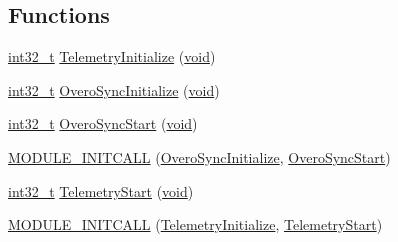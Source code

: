 \subsection*{Functions}
\begin{DoxyCompactItemize}
\item 
\hyperlink{group___n_a_m_e_gafd12020da5a235dfcf0c3c748fb5baed}{int32\-\_\-t} \hyperlink{group___telemetry_module_ga058925ecc8ea2cd938fb3e9d21edb2ac}{Telemetry\-Initialize} (\hyperlink{group___n_a_m_e_ga18028b8badbf1ea7e704ccac3c488e82}{void})
\item 
\hyperlink{group___n_a_m_e_gafd12020da5a235dfcf0c3c748fb5baed}{int32\-\_\-t} \hyperlink{group___telemetry_module_gae0e77f24c85219aa88e348edb409cf6c}{Overo\-Sync\-Initialize} (\hyperlink{group___n_a_m_e_ga18028b8badbf1ea7e704ccac3c488e82}{void})
\item 
\hyperlink{group___n_a_m_e_gafd12020da5a235dfcf0c3c748fb5baed}{int32\-\_\-t} \hyperlink{group___telemetry_module_gad17ab9f25d8183e8dbaeed2d1e58b788}{Overo\-Sync\-Start} (\hyperlink{group___n_a_m_e_ga18028b8badbf1ea7e704ccac3c488e82}{void})
\item 
\hyperlink{group___telemetry_module_ga90e0f6cdee6c499399c0627e15ffcbd9}{M\-O\-D\-U\-L\-E\-\_\-\-I\-N\-I\-T\-C\-A\-L\-L} (\hyperlink{group___telemetry_module_gae0e77f24c85219aa88e348edb409cf6c}{Overo\-Sync\-Initialize}, \hyperlink{group___telemetry_module_gad17ab9f25d8183e8dbaeed2d1e58b788}{Overo\-Sync\-Start})
\item 
\hyperlink{group___n_a_m_e_gafd12020da5a235dfcf0c3c748fb5baed}{int32\-\_\-t} \hyperlink{group___telemetry_module_ga251dc0181b1a02544cdee5e599bfc240}{Telemetry\-Start} (\hyperlink{group___n_a_m_e_ga18028b8badbf1ea7e704ccac3c488e82}{void})
\item 
\hyperlink{group___telemetry_module_ga76c4e3aa3c280b8fe0a71d2aa8d6ffd3}{M\-O\-D\-U\-L\-E\-\_\-\-I\-N\-I\-T\-C\-A\-L\-L} (\hyperlink{group___telemetry_module_ga058925ecc8ea2cd938fb3e9d21edb2ac}{Telemetry\-Initialize}, \hyperlink{group___telemetry_module_ga251dc0181b1a02544cdee5e599bfc240}{Telemetry\-Start})
\end{DoxyCompactItemize}

